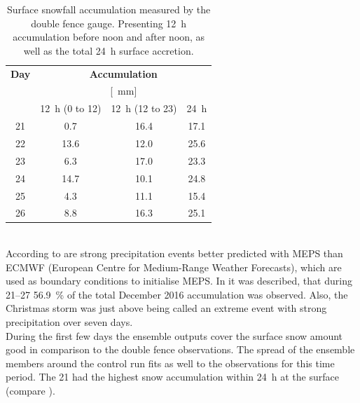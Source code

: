 \begin{table}[h]
	\begin{center}
		\caption{Surface snowfall accumulation measured by the double fence gauge. Presenting \SI{12}{\hour} accumulation before noon and after noon, as well as the total \SI{24}{\hour} surface accretion. }\label{tab:sfc_acc}
		\begin{tabular}{c|c|c|c}
			\hline \hline
			\textbf{Day} & \multicolumn{3}{c}{\textbf{Accumulation}} \\ 
			& \multicolumn{3}{c}{[\SI{}{\mm}]} \\ \hline
			& \SI{12}{\hour} (\footnotesize{\num{0} to \SI{12}{\UTC}}) & \SI{12}{\hour} (\footnotesize{\num{12} to \SI{23}{\UTC}}) & \SI{24}{\hour} \\ \hline \hline
			\SI{21}{\dec} & \num{0.7} &  \num{16.4} & \num{17.1} \\ \hline
			\SI{22}{\dec} & \num{13.6} &  \num{12.0} & \num{25.6} \\ \hline
			\SI{23}{\dec} & \num{6.3} &  \num{17.0} & \num{23.3} \\ \hline
			\SI{24}{\dec} & \num{14.7} &  \num{10.1} & \num{24.8} \\ \hline
			\SI{25}{\dec} & \num{4.3} &  \num{11.1} & \num{15.4} \\ \hline
			\SI{26}{\dec} & \num{8.8} &  \num{16.3} & \num{25.1} \\ 
			\hline \hline
		\end{tabular}
	\end{center}
\end{table}
%
\\
According to \cite{muller_arome-metcoop:_2017} are strong precipitation events better predicted with MEPS than ECMWF (European Centre for Medium-Range Weather Forecasts), which are used as boundary conditions to initialise MEPS. In  it was described, that during \SIrange{21}{27}{\dec} \SI{56.9}{\percent} of the total December 2016 accumulation was observed. Also, the Christmas storm was just above being called an extreme event with strong precipitation over seven days. 
\\
During the first few days the ensemble outputs cover the surface snow amount good in comparison to the double fence observations.
The spread of the ensemble members around the control run fits as well to the observations for this time period. The \SI{21}{\dec} had the highest snow accumulation within \SI{24}{\hour} at the surface (compare ). %
\\ \noindent
